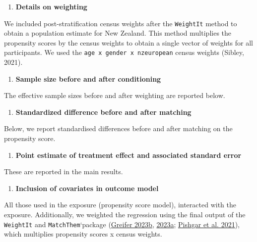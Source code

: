 \documentclass[
  singlecolumn]{report}
\providecommand{\tightlist}{%
  \setlength{\itemsep}{0pt}\setlength{\parskip}{0pt}}\usepackage{longtable,booktabs,array}
\begin{document}
\begin{enumerate}
\def\labelenumi{\arabic{enumi}.}
\setcounter{enumi}{6}
\tightlist
\item
  \textbf{Details on weighting}
\end{enumerate}

We included post-stratification census weights after the
\texttt{WeightIt} method to obtain a population estimate for New
Zealand. This method multiplies the propensity scores by the census
weights to obtain a single vector of weights for all participants. We
used the \texttt{age\ x\ gender\ x\ nzeuropean} census weights (Sibley,
2021).

\begin{enumerate}
\def\labelenumi{\arabic{enumi}.}
\setcounter{enumi}{7}
\tightlist
\item
  \textbf{Sample size before and after conditioning}
\end{enumerate}

The effective sample sizes before and after weighting are reported
below.

\begin{enumerate}
\def\labelenumi{\arabic{enumi}.}
\setcounter{enumi}{8}
\tightlist
\item
  \textbf{Standardized difference before and after matching}
\end{enumerate}

Below, we report standardised differences before and after matching on
the propensity score.

\begin{enumerate}
\def\labelenumi{\arabic{enumi}.}
\setcounter{enumi}{9}
\tightlist
\item
  \textbf{Point estimate of treatment effect and associated standard
  error}
\end{enumerate}

These are reported in the main results.

\begin{enumerate}
\def\labelenumi{\arabic{enumi}.}
\setcounter{enumi}{10}
\tightlist
\item
  \textbf{Inclusion of covariates in outcome model}
\end{enumerate}

All those used in the exposure (propensity score model), interacted with
the exposure. Additionally, we weighted the regression using the final
output of the \texttt{WeightIt} and \texttt{MatchThem}`package
(\protect\hyperlink{ref-greifer2023a}{Greifer 2023b},
\protect\hyperlink{ref-greifer2023b}{2023a};
\protect\hyperlink{ref-pishgar2021}{Pishgar et al. 2021}), which
multiplies propensity scores x census weights.
\end{document}
